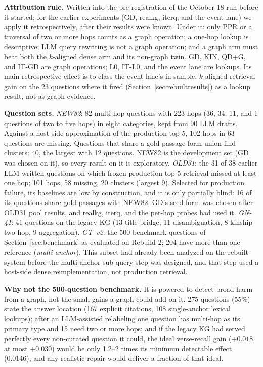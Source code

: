 \textbf{Attribution rule.} Written into the pre-registration of the
October 18 run before it started; for the earlier experiments (GD,
realkg, iterq, and the event lane) we apply it retrospectively, after
their results were known. Under it: only PPR or a traversal of two or more hops counts as
a graph operation; a one-hop lookup is descriptive; LLM query rewriting
is not a graph operation; and a graph arm must beat both the $k$-aligned
dense arm and its non-graph twin. GD, KIN, QD+G, and IT-GD are graph
operations; L0, IT-L0, and the event lane are lookups. Its main
retrospective effect is to class the event lane's in-sample,
$k$-aligned retrieval gain on the 23 questions where it fired
(Section~\ref{sec:rebuiltresults}) as a lookup result, not as graph
evidence.

\textbf{Question sets.} \emph{NEW82}: 82 multi-hop questions with 223
hops (36, 34, 11, and 1 questions of two to five hops) in eight
categories, kept from 90 LLM drafts. Against a host-side approximation of
the production top-5, 102 hops in 63 questions are missing. Questions
that share a gold passage form union-find clusters: 40, the largest with
12 questions. NEW82 is the development set (GD was chosen on it), so
every result on it is exploratory. \emph{OLD31}: the 31 of 38 earlier
LLM-written questions on which frozen production top-5 retrieval missed
at least one hop; 101 hops, 58 missing, 20 clusters (largest 9).
Selected for production failure, its baselines are low by construction,
and it is only partially blind: 16 of its questions share gold passages
with NEW82, GD's seed form was chosen after OLD31 pool results, and
realkg, iterq, and the per-hop probes had used it. \emph{GN-41}: 41
questions on the legacy KG (13 title-bridge, 11 disambiguation, 8
kinship two-hop, 9 aggregation). \emph{GT~v2}: the 500 benchmark
questions of Section~\ref{sec:benchmark} as evaluated on Rebuild-2; 204
have more than one reference (\emph{multi-anchor}). This subset had
already been analyzed on the rebuilt system before the multi-anchor
sub-query step was designed, and that step used a host-side dense
reimplementation, not production retrieval.

\textbf{Why not the 500-question benchmark.} It is powered to detect
broad harm from a graph, not the small gains a graph could add on it.
275 questions (55\%) state the answer location (167 explicit citations,
108 single-anchor lexical lookups); after an LLM-assisted relabeling one
question has multi-hop as its primary type and 15 need two or more hops;
and if the legacy KG had served perfectly every non-curated question it
could, the ideal verse-recall gain ($+0.018$, at most $+0.030$) would be
only 1.2--2 times its minimum detectable effect (0.0146), and any
realistic repair would deliver a fraction of that ideal.

